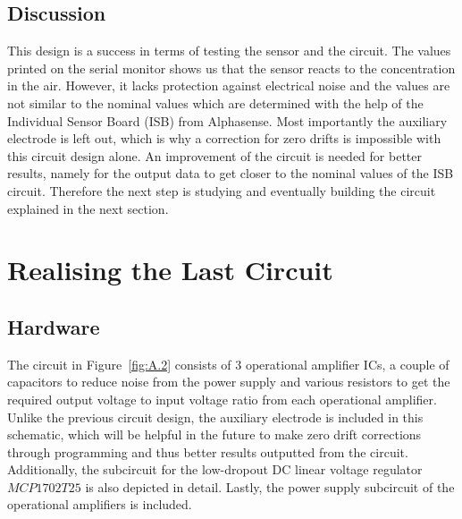 \subsection{Discussion}
This design is a success in terms of testing the sensor and the circuit. The values printed on the serial monitor shows us that the sensor reacts to the  concentration in the air. However, it lacks protection against electrical noise and the values are not similar to the nominal values which are determined with the help of the Individual Sensor Board (ISB) from Alphasense. Most importantly the auxiliary electrode is left out, which is why a correction for zero drifts is impossible with this circuit design alone. An improvement of the circuit is needed for better results, namely for the output data to get closer to the nominal values of the ISB circuit. Therefore the next step is studying and eventually building the circuit explained in the next section.  


\section{Realising the Last Circuit}
\subsection{Hardware}
The circuit in Figure~\ref{fig:A.2} consists of 3 operational amplifier ICs, a couple of capacitors to reduce noise from the power supply and various resistors to get the required output voltage to input voltage ratio from each operational amplifier. Unlike the previous circuit design, the auxiliary electrode is included in this schematic, which will be helpful in the future to make zero drift corrections through programming and thus better results outputted from the circuit. Additionally, the subcircuit for the low-dropout DC linear voltage regulator $MCP1702T25$ is also depicted in detail. Lastly, the power supply subcircuit of the operational amplifiers is included.

